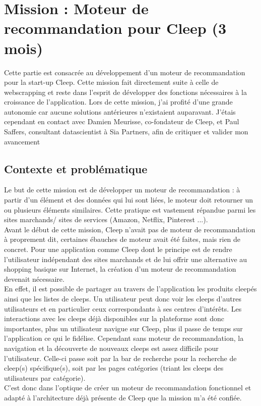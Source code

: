 \documentclass{article} %
\begin{document}
\newpage

\section{Mission : Moteur de recommandation pour Cleep (3 mois)}

Cette partie est consacrée au développement d'un moteur de recommandation pour la start-up Cleep. Cette mission fait directement suite à celle de webscrapping et reste dans l'esprit de développer des fonctions nécessaires à la croissance de l'application. Lors de cette mission, j'ai profité d'une grande autonomie car aucune solutions antérieures n'existaient auparavant. J'étais cependant en contact avec Damien Meurisse, co-fondateur de Cleep, et Paul Saffers, consultant datascientist à Sia Partners, afin de critiquer et valider mon avancement 

\subsection{Contexte et problématique}

Le but de cette mission est de développer un moteur de recommandation : à partir d'un élément et des données qui lui sont liées, le moteur doit retourner un ou plusieurs éléments similaires. Cette pratique est vastement répandue parmi les sites marchands/ sites de services (Amazon, Netflix, Pinterest ...).\\

Avant le début de cette mission, Cleep n'avait pas de moteur de recommandation à proprement dit, certaines ébauches de moteur avait été faites, mais rien de concret. Pour une application comme Cleep dont le principe est de rendre l'utilisateur indépendant des sites marchands et de lui offrir une alternative au shopping basique sur Internet, la création d'un moteur de recommandation devenait nécessaire.\\
En effet, il est possible de partager au travers de l'application les produits cleepés ainsi que les listes de cleeps. Un utilisateur peut donc voir les cleeps d'autres utilisateurs et en particulier ceux correspondants à ses centres d'intérêts. Les interactions avec les cleeps déjà disponibles sur la plateforme sont donc importantes, plus un utilisateur navigue sur Cleep, plus il passe de temps sur l'application ce qui le fidélise. Cependant sans moteur de recommandation, la navigation et la découverte de nouveaux cleeps est assez difficile pour l'utilisateur. Celle-ci passe soit par la bar de recherche pour la recherche de cleep(s) spécifique(s), soit par les pages catégories (triant les cleeps des utilisateurs par catégorie).\\
C'est donc dans l'optique de créer un moteur de recommandation fonctionnel et adapté à l'architecture déjà présente de Cleep que la mission m'a été confiée.
\end{document}
